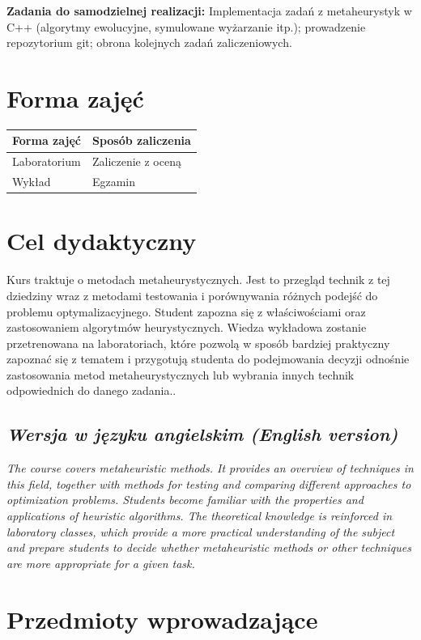 \documentclass[12pt, a4paper]{article}
\begin{document}
\vspace{4pt}
\noindent\textbf{Zadania do samodzielnej realizacji:} Implementacja zadań z metaheurystyk w C++ (algorytmy ewolucyjne, symulowane wyżarzanie itp.); prowadzenie repozytorium git; obrona kolejnych zadań zaliczeniowych.

\section{Forma zajęć}

\begin{tabular}{ll}
  \hline
  \textbf{Forma zajęć} & \textbf{Sposób zaliczenia} \\
  \hline
  Laboratorium & Zaliczenie z oceną \\
  Wykład & Egzamin \\
  \hline
\end{tabular}

\section{Cel dydaktyczny}

Kurs traktuje o metodach metaheurystycznych. Jest to przegląd technik z tej dziedziny wraz z metodami testowania i porównywania różnych podejść do problemu optymalizacyjnego. Student zapozna się z właściwościami oraz zastosowaniem algorytmów heurystycznych. Wiedza wykładowa zostanie przetrenowana na laboratoriach, które pozwolą w sposób bardziej praktyczny zapoznać się z tematem i przygotują studenta do podejmowania decyzji odnośnie zastosowania metod metaheurystycznych lub wybrania innych technik odpowiednich do danego zadania..

\subsection*{\textit{Wersja w języku angielskim (English version)}}

\textit{The course covers metaheuristic methods. It provides an overview of techniques in this field, together with methods for testing and comparing different approaches to optimization problems. Students become familiar with the properties and applications of heuristic algorithms. The theoretical knowledge is reinforced in laboratory classes, which provide a more practical understanding of the subject and prepare students to decide whether metaheuristic methods or other techniques are more appropriate for a given task.}


\section{Przedmioty wprowadzające}
\end{document}
